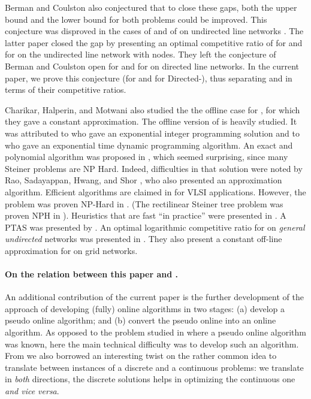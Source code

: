 \documentclass[11pt]{article}
\begin{document}
Berman and Coulston also conjectured that to close these gaps, both the upper bound and the lower bound
for both problems could be improved.
This conjecture was disproved in the cases of   and of  on undirected line networks \cite{KK2014}.
The latter paper closed the gap by presenting an optimal competitive ratio of  for  and
 for  on the undirected line network with  nodes.
They left the conjecture of Berman and Coulston open for  and for  on directed line networks.
In the current paper, we prove this conjecture (for  and for Directed-), thus separating  and  in terms of their competitive ratios.



Charikar, Halperin, and Motwani \cite{halperin} also studied the  the offline case for , for which they gave   a constant approximation.
The offline version of  is heavily studied.
It was  attributed to    \cite{natansky} who gave an exponential integer programming solution and to \cite{presented-rsa} who gave an exponential time dynamic programming algorithm.
An exact and polynomial algorithm was proposed in \cite{rsa-error}, which seemed surprising, since many Steiner  problems are NP Hard.
Indeed, difficulties in that solution were noted by Rao, Sadayappan, Hwang, and Shor \cite{shor-rsa}, who also presented an approximation algorithm.
Efficient algorithms are claimed in \cite{another-at-poly} for VLSI applications.
However, the problem was proven NP-Hard in \cite{rsa-nph}.
(The rectilinear Steiner tree problem was proven NPH in \cite{garey-johnson}).
Heuristics that are fast ``in practice'' were presented in \cite{cong}.
A PTAS was presented by \cite{ptas1}.
An optimal logarithmic competitive ratio for  on {\em general undirected} networks was presented in \cite{MAicalp12}.
They also present a constant off-line approximation for  on grid networks.

\paragraph*{On the relation between this paper and \cite{KK2014}.}
An additional contribution of the current paper is the further development of the approach of developing (fully) online algorithms in two stages:
(a) develop a pseudo online algorithm; and
(b) convert the pseudo online into an online algorithm.
As opposed to the problem studied in \cite{KK2014} where a pseudo online algorithm was known, here the main technical difficulty was to develop such an algorithm.
From \cite{KK2014} we also borrowed an interesting twist on the rather common idea to translate between instances of a discrete and a continuous problems: we translate in {\em both} directions, the discrete  solutions helps in optimizing the continuous one {\em and vice versa}.
\end{document}
